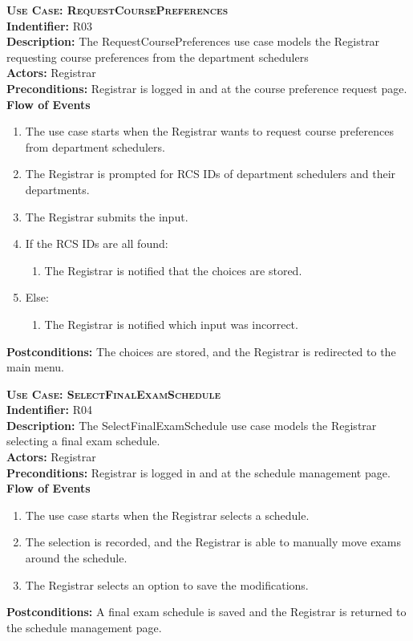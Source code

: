 \documentclass[11pt]{article}
\newenvironment{usecase}{%
	\def\title##1{ {\large \bfseries  \scshape {Use Case:} ##1} \\ }
 	\def\id##1{{\bf Indentifier:} ##1\\}
	\def\des##1{ {\bf Description:} ##1\\}
	\def\actors##1{ {\bf Actors:} ##1\\}
    	\def\pre##1{ {\bf Preconditions:} ##1 \\} %
    	\def\flow##1{ {\bf Flow of Events} ##1}%
    	\newenvironment{ucenum}{%
        	\begin{enumerate}[nolistsep]\small}%
        	{\end{enumerate}}
	\def\post##1{ {\bf Postconditions:} ##1 \\}
}{\vspace{.05in}}
\begin{document}
\begin{usecase}
  \title{RequestCoursePreferences}
  \id{R03}
  \des{The RequestCoursePreferences use case models the Registrar requesting course preferences from the department schedulers}
  \actors{Registrar}
  \pre{Registrar is logged in and at the course preference request page.}
  \flow{}
  \begin{ucenum}
  \item The use case starts when the Registrar wants to request course preferences from department schedulers.
  \item The Registrar is prompted for RCS IDs of department schedulers and their departments.
  \item The Registrar submits the input.
  \item If the RCS IDs are all found:
    \begin{ucenum} \item The Registrar is notified that the choices are stored. \end{ucenum}
  \item Else:
    \begin{ucenum} \item The Registrar is notified which input was incorrect. \end{ucenum}
  \end{ucenum}
  \post{The choices are stored, and the Registrar is redirected to the main menu.}
\end{usecase}

\begin{usecase}
  \title{SelectFinalExamSchedule}
  \id{R04}
  \des{The SelectFinalExamSchedule use case models the Registrar selecting a final exam schedule.}
  \actors{Registrar}
  \pre{Registrar is logged in and at the schedule management page.}
  \flow{}
  \begin{ucenum}
  \item The use case starts when the Registrar selects a schedule.
  \item The selection is recorded, and the Registrar is able to manually move exams around the schedule.
  \item The Registrar selects an option to save the modifications.
  \end{ucenum}
  \post{A final exam schedule is saved and the Registrar is returned to the schedule management page.}
\end{usecase}
\end{document}
